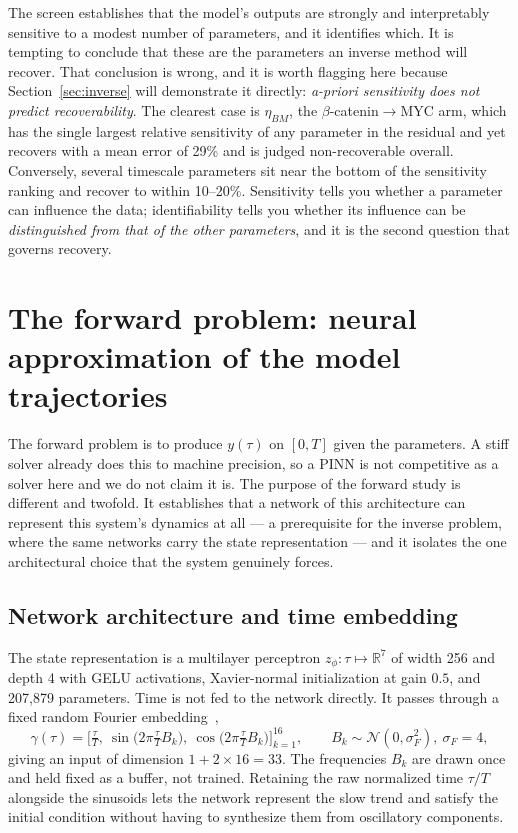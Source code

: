 \documentclass[11pt]{article}
\newcommand{\bcat}{$\beta$-\hspace{0pt}catenin}
\begin{document}
The screen establishes that the model's outputs are strongly and
interpretably sensitive to a modest number of parameters, and it identifies
which. It is tempting to conclude that these are the parameters an inverse
method will recover. That conclusion is wrong, and it is worth flagging here
because Section~\ref{sec:inverse} will demonstrate it directly:
\emph{a-priori sensitivity does not predict recoverability}. The clearest case
is $\eta_{BM}$, the \bcat{}$\to$MYC arm, which has the single largest relative
sensitivity of any parameter in the residual and yet recovers with a mean error
of 29\% and is judged non-recoverable overall. Conversely, several timescale
parameters sit near the bottom of the sensitivity ranking and recover to within
10--20\%. Sensitivity tells you whether a parameter can influence the data;
identifiability tells you whether its influence can be \emph{distinguished from
that of the other parameters}, and it is the second question that governs
recovery.
\section{The forward problem: neural approximation of the model trajectories}
\label{sec:forward}

The forward problem is to produce $y(\tau)$ on $[0,T]$ given the parameters.
A stiff solver already does this to machine precision, so a PINN is not
competitive as a solver here and we do not claim it is. The purpose of the
forward study is different and twofold. It establishes that a network of this
architecture can represent this system's dynamics at all --- a prerequisite for
the inverse problem, where the same networks carry the state representation ---
and it isolates the one architectural choice that the system genuinely forces.

\subsection{Network architecture and time embedding}

The state representation is a multilayer perceptron $z_\phi : \tau \mapsto
\mathbb{R}^7$ of width 256 and depth 4 with GELU activations, Xavier-normal
initialization at gain $0.5$, and 207,879 parameters. Time is not fed to the
network directly. It passes through a fixed random Fourier
embedding~\citep{tancik2020fourier},
\begin{equation}
\gamma(\tau) = \Big[\tfrac{\tau}{T},\
\sin\!\big(2\pi\tfrac{\tau}{T}B_k\big),\
\cos\!\big(2\pi\tfrac{\tau}{T}B_k\big)\Big]_{k=1}^{16},
\qquad B_k \sim \mathcal{N}(0, \sigma_F^2),\ \sigma_F = 4,
\label{eq:fourier}
\end{equation}
giving an input of dimension $1 + 2\times16 = 33$. The frequencies $B_k$ are
drawn once and held fixed as a buffer, not trained. Retaining the raw
normalized time $\tau/T$ alongside the sinusoids lets the network represent the
slow trend and satisfy the initial condition without having to synthesize them
from oscillatory components.
\end{document}
